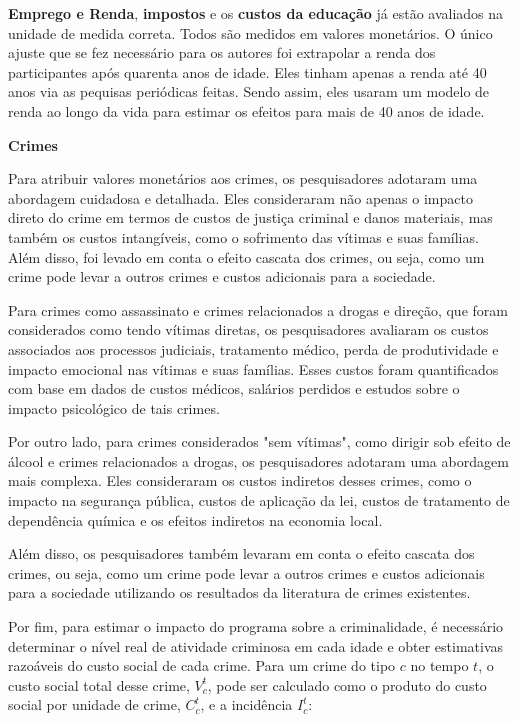 \documentclass[12pt,letterpaper]{article}
\newcommand{\1}{\mathbbm{1}}
\numberwithin{equation}{section}
\begin{document}
\textbf{Emprego e Renda}, \textbf{impostos} e os \textbf{custos da educação} já estão avaliados na unidade de medida correta. Todos são medidos em valores monetários. O único ajuste que se fez necessário para os autores foi extrapolar a renda dos participantes após quarenta anos de idade. Eles tinham apenas a renda até 40 anos via as pequisas periódicas feitas. Sendo assim, eles usaram um modelo de renda ao longo da vida para estimar os efeitos para mais de 40 anos de idade. 

{\large \textbf{Crimes}}

Para atribuir valores monetários aos crimes, os pesquisadores adotaram uma abordagem cuidadosa e detalhada. Eles consideraram não apenas o impacto direto do crime em termos de custos de justiça criminal e danos materiais, mas também os custos intangíveis, como o sofrimento das vítimas e suas famílias. Além disso, foi levado em conta o efeito cascata dos crimes, ou seja, como um crime pode levar a outros crimes e custos adicionais para a sociedade.

Para crimes como assassinato e crimes relacionados a drogas e direção, que foram considerados como tendo vítimas diretas, os pesquisadores avaliaram os custos associados aos processos judiciais, tratamento médico, perda de produtividade e impacto emocional nas vítimas e suas famílias. Esses custos foram quantificados com base em dados de custos médicos, salários perdidos e estudos sobre o impacto psicológico de tais crimes.

Por outro lado, para crimes considerados "sem vítimas", como dirigir sob efeito de álcool e crimes relacionados a drogas, os pesquisadores adotaram uma abordagem mais complexa. Eles consideraram os custos indiretos desses crimes, como o impacto na segurança pública, custos de aplicação da lei, custos de tratamento de dependência química e os efeitos indiretos na economia local.

Além disso, os pesquisadores também levaram em conta o efeito cascata dos crimes, ou seja, como um crime pode levar a outros crimes e custos adicionais para a sociedade utilizando os resultados da literatura de crimes existentes.

Por fim, para estimar o impacto do programa sobre a criminalidade, é necessário determinar o nível real de atividade criminosa em cada idade e obter estimativas razoáveis do custo social de cada crime. Para um crime do tipo $c$ no tempo $t$, o custo social total desse crime, $V^t_c$, pode ser calculado como o produto do custo social por unidade de crime, $C^t_c$, e a incidência $I^t_c$:
\end{document}
